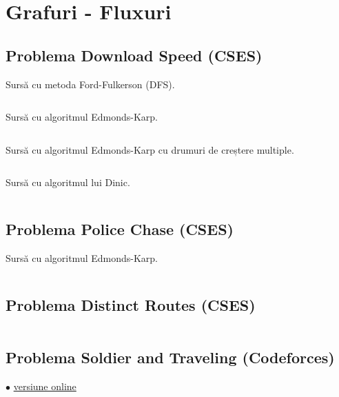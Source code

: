 \documentclass[../main.tex]{subfiles}
\begin{document}
\chapter{Grafuri - Fluxuri}

\section{Problema Download Speed (CSES)}
\label{code:download-speed}

Sursă cu metoda Ford-Fulkerson (DFS).

\inputminted{cpp}{../src/graphs/download-speed-ford-fulkerson.cpp}

Sursă cu algoritmul Edmonds-Karp.

\inputminted{cpp}{../src/graphs/download-speed-edmonds-karp-1.cpp}

Sursă cu algoritmul Edmonds-Karp cu drumuri de creștere multiple.

\inputminted{cpp}{../src/graphs/download-speed-edmonds-karp-2.cpp}

Sursă cu algoritmul lui Dinic.

\inputminted{cpp}{../src/graphs/download-speed-dinic.cpp}

\section{Problema Police Chase (CSES)}
\label{code:police-chase}

Sursă cu algoritmul Edmonds-Karp.

\inputminted{cpp}{../src/graphs/police-chase.cpp}


\section{Problema Distinct Routes (CSES)}
\label{code:distinct-routes}

\inputminted{cpp}{../src/graphs/distinct-routes.cpp}


\section{Problema Soldier and Traveling (Codeforces)}
\label{code:soldier-and-traveling}
$\bullet$
\href{https://codeforces.com/contest/546/submission/372949140}{versiune online}

\inputminted{cpp}{../src/graphs/soldier-and-traveling.cpp}
\end{document}
